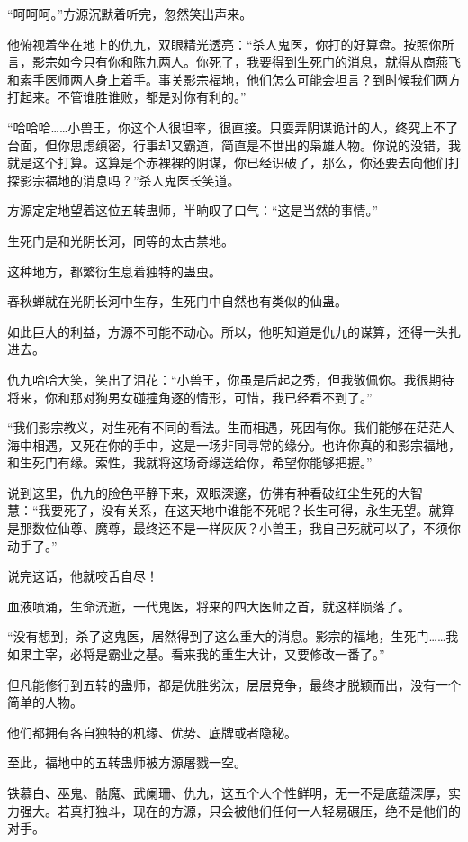 \begin{this_body}
“呵呵呵。”方源沉默着听完，忽然笑出声来。

他俯视着坐在地上的仇九，双眼精光透亮：“杀人鬼医，你打的好算盘。按照你所言，影宗如今只有你和陈九两人。你死了，我要得到生死门的消息，就得从商燕飞和素手医师两人身上着手。事关影宗福地，他们怎么可能会坦言？到时候我们两方打起来。不管谁胜谁败，都是对你有利的。”

“哈哈哈……小兽王，你这个人很坦率，很直接。只耍弄阴谋诡计的人，终究上不了台面，但你思虑缜密，行事却又霸道，简直是不世出的枭雄人物。你说的没错，我就是这个打算。这算是个赤裸裸的阴谋，你已经识破了，那么，你还要去向他们打探影宗福地的消息吗？”杀人鬼医长笑道。

方源定定地望着这位五转蛊师，半晌叹了口气：“这是当然的事情。”

生死门是和光阴长河，同等的太古禁地。

这种地方，都繁衍生息着独特的蛊虫。

春秋蝉就在光阴长河中生存，生死门中自然也有类似的仙蛊。

如此巨大的利益，方源不可能不动心。所以，他明知道是仇九的谋算，还得一头扎进去。

仇九哈哈大笑，笑出了泪花：“小兽王，你虽是后起之秀，但我敬佩你。我很期待将来，你和那对狗男女碰撞角逐的情形，可惜，我已经看不到了。”

“我们影宗教义，对生死有不同的看法。生而相遇，死因有你。我们能够在茫茫人海中相遇，又死在你的手中，这是一场非同寻常的缘分。也许你真的和影宗福地，和生死门有缘。索性，我就将这场奇缘送给你，希望你能够把握。”

说到这里，仇九的脸色平静下来，双眼深邃，仿佛有种看破红尘生死的大智慧：“我要死了，没有关系，在这天地中谁能不死呢？长生可得，永生无望。就算是那数位仙尊、魔尊，最终还不是一样灰灰？小兽王，我自己死就可以了，不须你动手了。”

说完这话，他就咬舌自尽！

血液喷涌，生命流逝，一代鬼医，将来的四大医师之首，就这样陨落了。

“没有想到，杀了这鬼医，居然得到了这么重大的消息。影宗的福地，生死门……我如果主宰，必将是霸业之基。看来我的重生大计，又要修改一番了。”

但凡能修行到五转的蛊师，都是优胜劣汰，层层竞争，最终才脱颖而出，没有一个简单的人物。

他们都拥有各自独特的机缘、优势、底牌或者隐秘。

至此，福地中的五转蛊师被方源屠戮一空。

铁慕白、巫鬼、骷魔、武阑珊、仇九，这五个人个性鲜明，无一不是底蕴深厚，实力强大。若真打独斗，现在的方源，只会被他们任何一人轻易碾压，绝不是他们的对手。


\end{this_body}
